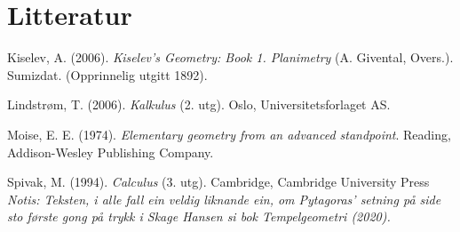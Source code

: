 



\chapter*{Litteratur}
Kiselev, A. (2006). \textit{Kiselev's Geometry: Book 1. Planimetry} (A. Givental, Overs.). Sumizdat. (Opprinnelig utgitt 1892).\vsk

Lindstrøm, T. (2006). \textit{Kalkulus} (2. utg). Oslo, Universitetsforlaget AS.\vsk

Moise, E. E. (1974). \textit{Elementary geometry from an advanced standpoint}. Reading, Addison-Wesley Publishing Company.\vsk

Spivak, M. (1994). \textit{Calculus} (3. utg). Cambridge, Cambridge University Press
\vfill
\textit{\footnotesize Notis: Teksten, i alle fall ein veldig liknande ein, om Pytagoras' setning på side \pageref{pytforklaringintro} sto første gong på trykk i Skage Hansen si bok \textit{Tempelgeometri} (2020).}
\newpage
